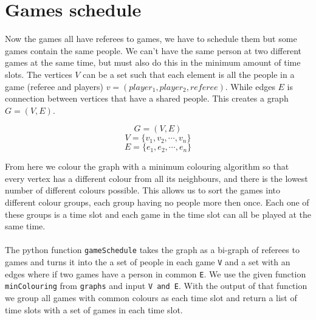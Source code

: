 \documentclass[a4paper]{article}
\begin{document}
\section{Games schedule}
Now the games all have referees to games, we have to schedule them
but some games contain the same people. We can't have the same person at two different games at the same time, but must also do this in the minimum amount of time slots. The vertices $V$ can be a set such that each element is all the people in a game (referee and players) $v=(player_1, player_2, referee)$. While edges $E$ is connection between vertices that have a shared people. This creates a graph $G = (V, E)$.
\begin{center}
\begin{Large}
\begin{equation}\label{eq:G}
    G = (V, E)
\end{equation}
\begin{equation}\label{eq:V}
    V = \{v_1, v_2, \cdots, v_n\}
\end{equation}
\begin{equation}\label{eq:E}
    E = \{e_1, e_2, \cdots, e_n\}
\end{equation}
\end{Large}
\end{center}
From here we colour the graph with a minimum colouring algorithm so that every vertex has a different colour from all its neighbours, and there is the lowest number of different colours possible. This allows us to sort the games into different colour groups, each group having no people more then once. Each one of these groups is a time slot and each game in the time slot can all be played at the same time.
\\\\
The python function \verb+gameSchedule+ takes the graph as a bi-graph of referees to games and turns it into the a set of people in each game \verb+V+ and a set with an edges where if two games have a person in common \verb+E+. We use the given function \verb+minColouring+ from \verb+graphs+ and input \verb+V and E+. With the output of that function we group all games with common colours as each time slot and return a list of time slots with a set of games in each time slot.
\end{document}
